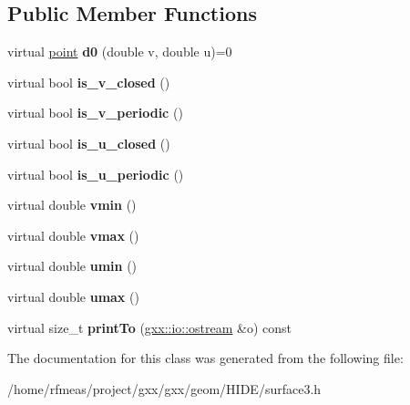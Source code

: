 \subsection*{Public Member Functions}
\begin{DoxyCompactItemize}
\item 
virtual \hyperlink{classgxx_1_1geom3_1_1point}{point} {\bfseries d0} (double v, double u)=0\hypertarget{classgxx_1_1surf3_1_1surface_a1463b395538aaba62482c3e40d7bbc37}{}\label{classgxx_1_1surf3_1_1surface_a1463b395538aaba62482c3e40d7bbc37}

\item 
virtual bool {\bfseries is\+\_\+v\+\_\+closed} ()\hypertarget{classgxx_1_1surf3_1_1surface_ae695cfef5a0aefcd5b44eb3533c50237}{}\label{classgxx_1_1surf3_1_1surface_ae695cfef5a0aefcd5b44eb3533c50237}

\item 
virtual bool {\bfseries is\+\_\+v\+\_\+periodic} ()\hypertarget{classgxx_1_1surf3_1_1surface_acdc3f4d06bdf9462237e5da48aa4080b}{}\label{classgxx_1_1surf3_1_1surface_acdc3f4d06bdf9462237e5da48aa4080b}

\item 
virtual bool {\bfseries is\+\_\+u\+\_\+closed} ()\hypertarget{classgxx_1_1surf3_1_1surface_ad611c255879b1430f3e77abd51e1f509}{}\label{classgxx_1_1surf3_1_1surface_ad611c255879b1430f3e77abd51e1f509}

\item 
virtual bool {\bfseries is\+\_\+u\+\_\+periodic} ()\hypertarget{classgxx_1_1surf3_1_1surface_a13883ab4029e48e88577a53294999ce1}{}\label{classgxx_1_1surf3_1_1surface_a13883ab4029e48e88577a53294999ce1}

\item 
virtual double {\bfseries vmin} ()\hypertarget{classgxx_1_1surf3_1_1surface_a4b224ad514b0a89df20eb8418f89a761}{}\label{classgxx_1_1surf3_1_1surface_a4b224ad514b0a89df20eb8418f89a761}

\item 
virtual double {\bfseries vmax} ()\hypertarget{classgxx_1_1surf3_1_1surface_a78e79292010f1847b4dbd8d5ca0078c8}{}\label{classgxx_1_1surf3_1_1surface_a78e79292010f1847b4dbd8d5ca0078c8}

\item 
virtual double {\bfseries umin} ()\hypertarget{classgxx_1_1surf3_1_1surface_a99c0da12133c655bd16f7c97a75055a3}{}\label{classgxx_1_1surf3_1_1surface_a99c0da12133c655bd16f7c97a75055a3}

\item 
virtual double {\bfseries umax} ()\hypertarget{classgxx_1_1surf3_1_1surface_a62bb9562be8568271bf7fe2c1afda3dc}{}\label{classgxx_1_1surf3_1_1surface_a62bb9562be8568271bf7fe2c1afda3dc}

\item 
virtual size\+\_\+t {\bfseries print\+To} (\hyperlink{classgxx_1_1io_1_1ostream}{gxx\+::io\+::ostream} \&o) const \hypertarget{classgxx_1_1surf3_1_1surface_aad144d13fbc5f54e7de7fe93df88904a}{}\label{classgxx_1_1surf3_1_1surface_aad144d13fbc5f54e7de7fe93df88904a}

\end{DoxyCompactItemize}


The documentation for this class was generated from the following file\+:\begin{DoxyCompactItemize}
\item 
/home/rfmeas/project/gxx/gxx/geom/\+H\+I\+D\+E/surface3.\+h\end{DoxyCompactItemize}
